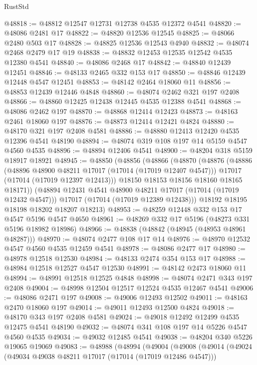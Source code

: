 \begin{lexlean}{RustStd}
\begin{coremodule}
@48818 := @48812 @12547 @12731 @12738 @4535 @12372 @4541
@48820 := @48086 @2481 @17
@48822 := @48820 @12536 @12545
@48825 := @48066 @2480 @503 @17
@48828 := @48825 @12536 @12543 @4940
@48832 := @48074 @2468 @2479 @17 @19
@48838 := @48832 @12453 @12535 @12542 @4535 @12380 @4541
@48840 := @48086 @2468 @17
@48842 := @48840 @12439 @12451
@48846 := @48133 @2465 @332 @153 @17
@48850 := @48846 @12439 @12448 @4547 @12451
@48853 := @48142 @2464 @18060 @11
@48856 := @48853 @12439 @12446 @4848
@48860 := @48074 @2462 @321 @197 @2408
@48866 := @48860 @12425 @12438 @12445 @4535 @12388 @4541
@48868 := @48086 @2462 @197
@48870 := @48868 @12414 @12423
@48873 := @48163 @2461 @18060 @197
@48876 := @48873 @12414 @12421 @4824
@48880 := @48170 @321 @197 @2408 @4581
@48886 := @48880 @12413 @12420 @4535 @12396 @4541 @48190
@48894 := @48074 @319 @108 @197 @14 @5159 @4547 @4560 @4535
@48896 := @48894 @12406 @4541
@48900 := @48204 @318 @5159 @18917 @18921
@48945 := @48850
    (@48856
      (@48866
        (@48870
          (@48876
            (@48886
              (@48896 @48900 @48211 @17017 (@17014 (@17019 @12407 @4547)))
              @17017
              (@17014 (@17019 @12397 @12413)))
            @18150
            @18153
            @18156
            @18160
            @18165
            @18171))
        (@48894 @12431 @4541 @48900 @48211 @17017 (@17014 (@17019 @12432 @4547)))
        @17017
        (@17014 (@17019 @12389 @12438)))
      @18192
      @18195
      @18198
      @18202
      @18207
      @18213)
@48953 := @48259 @12448 @332 @153 @17 @4547 @5196 @4547 @4650
@48961 := @48269 @332 @17 @5196 (@48273 @331 @5196 @18982 @18986)
@48966 := @48838 (@48842 (@48945 (@48953 @48961 @48287)))
@48970 := @48074 @2477 @108 @17 @14
@48976 := @48970 @12532 @4547 @4560 @4535 @12459 @4541
@48978 := @48086 @2477 @17
@48980 := @48978 @12518 @12530
@48984 := @48133 @2474 @354 @153 @17
@48988 := @48984 @12518 @12527 @4547 @12530
@48991 := @48142 @2473 @18060 @11
@48994 := @48991 @12518 @12525 @4848
@48998 := @48074 @2471 @343 @197 @2408
@49004 := @48998 @12504 @12517 @12524 @4535 @12467 @4541
@49006 := @48086 @2471 @197
@49008 := @49006 @12493 @12502
@49011 := @48163 @2470 @18060 @197
@49014 := @49011 @12493 @12500 @4824
@49018 := @48170 @343 @197 @2408 @4581
@49024 := @49018 @12492 @12499 @4535 @12475 @4541 @48190
@49032 := @48074 @341 @108 @197 @14 @5226 @4547 @4560 @4535
@49034 := @49032 @12485 @4541
@49038 := @48204 @340 @5226 @19065 @19069
@49083 := @48988
    (@48994
      (@49004
        (@49008
          (@49014
            (@49024
              (@49034 @49038 @48211 @17017 (@17014 (@17019 @12486 @4547)))

\end{coremodule}
\end{lexlean}
